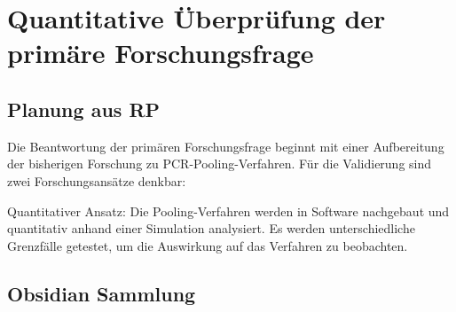 \chapter{Quantitative Überprüfung der primäre Forschungsfrage}



\section{Planung aus RP}
Die Beantwortung der primären Forschungsfrage beginnt mit einer Aufbereitung der bisherigen Forschung zu PCR-Pooling-Verfahren.
Für die Validierung sind zwei Forschungsansätze denkbar:

 Quantitativer Ansatz:
	Die Pooling-Verfahren werden in Software nachgebaut und quantitativ anhand einer Simulation analysiert.
	Es werden unterschiedliche Grenzfälle getestet, um die Auswirkung auf das Verfahren zu beobachten.


\section{Obsidian Sammlung}
\fi
